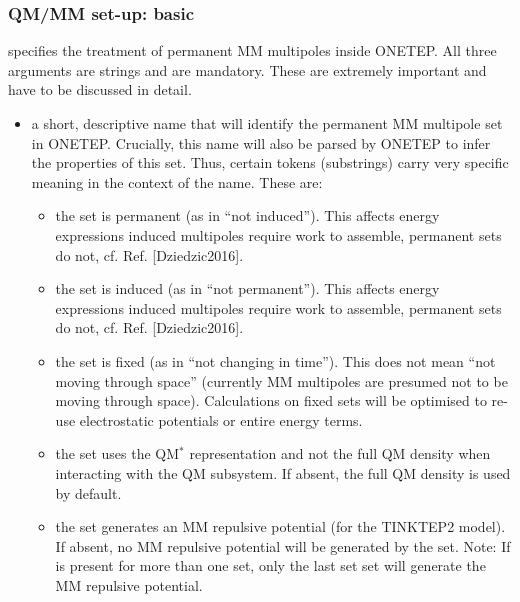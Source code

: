 \documentclass[letterpaper,10pt,english]{sphinxmanual}
\begin{document}
\subsubsection{QM/MM set-up: basic}
\label{\detokenize{tinktep:qm-mm-set-up-basic}}
 \textendash{} specifies the treatment of permanent MM
multipoles inside ONETEP. All three arguments are strings and are
mandatory. These are extremely important and have to be discussed in
detail.
\begin{itemize}
\item {} 
 \textendash{} a short, descriptive name that will identify the
permanent MM multipole set in ONETEP. Crucially, this name will also
be parsed by ONETEP to infer the properties of this set. Thus,
certain tokens (substrings) carry very specific meaning in the
context of the name. These are:
\begin{itemize}
\item {} 
 \textendash{} the set is permanent (as in “not induced”). This
affects energy expressions \textendash{} induced multipoles require work to
assemble, permanent sets do not,
cf. Ref. {[}Dziedzic2016{]}.

\item {} 
 \textendash{} the set is induced (as in “not permanent”). This affects
energy expressions \textendash{} induced multipoles require work to assemble,
permanent sets do not, cf. Ref. {[}Dziedzic2016{]}.

\item {} 
 \textendash{} the set is fixed (as in “not changing in time”). This
does not mean “not moving through space” (currently  MM
multipoles are presumed not to be moving through space).
Calculations on fixed sets will be optimised to re-use
electrostatic potentials or entire energy terms.

\item {} 
 \textendash{} the set uses the QM\(^*\) representation and
not the full QM density when interacting with the QM subsystem. If
absent, the full QM density is used by default.

\item {} 
 \textendash{} the set generates an MM repulsive potential (for the
TINKTEP2 model). If absent, no MM repulsive potential will be
generated by the set. Note: If  is present for more than
one set, only the last set set will generate the MM repulsive
potential.


\end{itemize}
\end{itemize}
\end{document}
